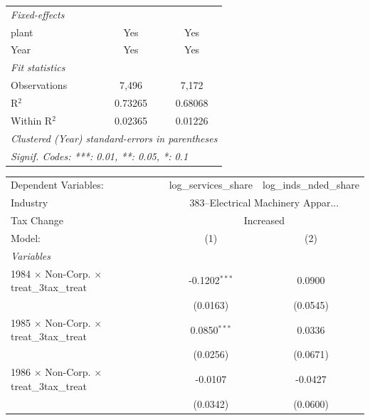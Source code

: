 \documentclass[
  12pt]{article}
\theoremstyle{definition}
\theoremstyle{remark}
\begin{document}
\begin{table}
\begin{minipage}{\linewidth}
\begin{tabular}{lcc}
   \midrule
   \emph{Fixed-effects}\\
   plant                                                   & Yes                    & Yes\\  
   Year                                                    & Yes                    & Yes\\  
   \midrule
   \emph{Fit statistics}\\
   Observations                                            & 7,496                  & 7,172\\  
   R$^2$                                                   & 0.73265                & 0.68068\\  
   Within R$^2$                                            & 0.02365                & 0.01226\\  
   \midrule \midrule
   \multicolumn{3}{l}{\emph{Clustered (Year) standard-errors in parentheses}}\\
   \multicolumn{3}{l}{\emph{Signif. Codes: ***: 0.01, **: 0.05, *: 0.1}}\\
\end{tabular}
\par\endgroup
\begingroup
\centering
\begin{tabular}{lcc}
   \tabularnewline \midrule \midrule
   Dependent Variables:                                    & log\_services\_share   & log\_inds\_nded\_share\\     
   Industry & \multicolumn{2}{c}{383–Electrical Machinery Appar...} \\ 
   Tax Change & \multicolumn{2}{c}{Increased} \\ 
   Model:                                                  & (1)                    & (2)\\  
   \midrule
   \emph{Variables}\\
   1984 $\times$ Non-Corp. $\times$ treat\_3tax\_treat     & -0.1202$^{***}$        & 0.0900\\   
                                                           & (0.0163)               & (0.0545)\\   
   1985 $\times$ Non-Corp. $\times$ treat\_3tax\_treat     & 0.0850$^{***}$         & 0.0336\\   
                                                           & (0.0256)               & (0.0671)\\   
   1986 $\times$ Non-Corp. $\times$ treat\_3tax\_treat     & -0.0107                & -0.0427\\   
                                                           & (0.0342)               & (0.0600)\\   

\end{tabular}
\end{minipage}
\end{table}
\end{document}
